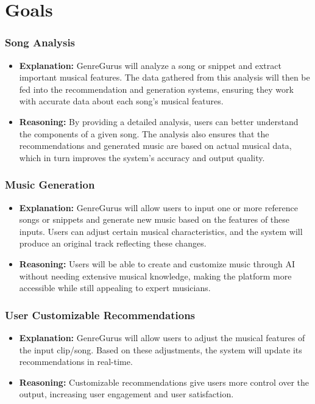 \documentclass{article}
\begin{document}

\section{Goals}
\subsubsection*{Song Analysis}
\begin{itemize}
    \item \textbf{Explanation:} GenreGurus will analyze a song or snippet and extract important musical features. The data gathered from this analysis will then be fed into the recommendation and generation systems, ensuring they work with accurate data about each song's musical features.
    \item \textbf{Reasoning:} By providing a detailed analysis, users can better understand the components of a given song. The analysis also ensures that the recommendations and generated music are based on actual musical data, which in turn improves the system’s accuracy and output quality.
\end{itemize}

\subsubsection*{Music Generation}
\begin{itemize}
    \item \textbf{Explanation:} GenreGurus will allow users to input one or more reference songs or snippets and generate new music based on the features of these inputs. Users can adjust certain musical characteristics, and the system will produce an original track reflecting these changes.
    \item \textbf{Reasoning:} Users will be able to create and customize music through AI without needing extensive musical knowledge, making the platform more accessible while still appealing to expert musicians.
\end{itemize}

\subsubsection*{User Customizable Recommendations}
\begin{itemize}
    \item \textbf{Explanation:} GenreGurus will allow users to adjust the musical features of the input clip/song. Based on these adjustments, the system will update its recommendations in real-time.
    \item \textbf{Reasoning:} Customizable recommendations give users more control over the output, increasing user engagement and user satisfaction.
\end{itemize}
\end{document}
